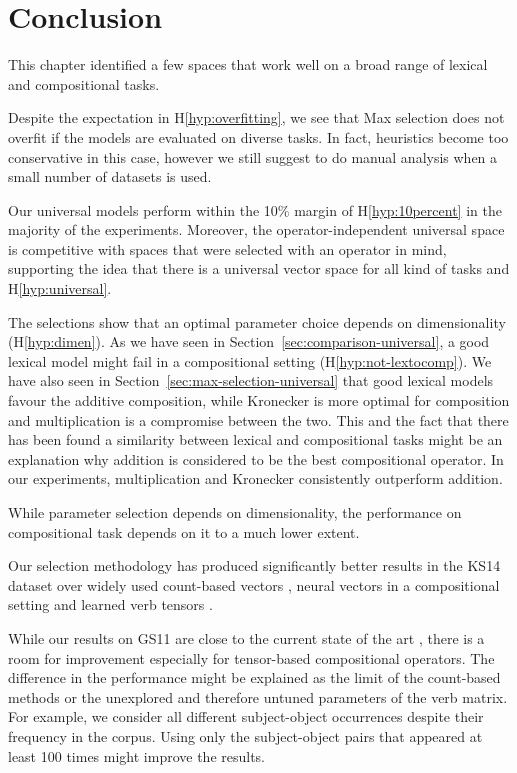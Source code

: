 \section{Conclusion}
\label{sec:conclusion-universal}

This chapter identified a few spaces that work well on a broad range of lexical and compositional tasks.

Despite the expectation in H\ref{hyp:overfitting}, we see that Max selection does not overfit if the models are evaluated on diverse tasks. In fact, heuristics become too conservative in this case, however we still suggest to do manual analysis when a small number of datasets is used.

Our universal models perform within the 10\% margin of H\ref{hyp:10percent} in the majority of the experiments. Moreover, the operator-independent universal space is competitive with spaces that were selected with an operator in mind, supporting the idea that there is a universal vector space for all kind of tasks and H\ref{hyp:universal}.

The selections show that an optimal parameter choice depends on dimensionality (H\ref{hyp:dimen}). As we have seen in Section~\ref{sec:comparison-universal}, a good lexical model might fail in a compositional setting (H\ref{hyp:not-lextocomp}). We have also seen in Section~\ref{sec:max-selection-universal} that good lexical models favour the additive composition, while Kronecker is more optimal for composition and multiplication is a compromise between the two. This and the fact that there has been found a similarity between lexical and compositional tasks \cite[\textcolor{citecolor}{Section~4}]{kiela-clark:2014:CVSC} might be an explanation why addition is considered to be the best compositional operator. In our experiments, multiplication and Kronecker consistently outperform addition.

While parameter selection depends on dimensionality, the performance on compositional task depends on it to a much lower extent.

Our selection methodology has produced significantly better results in the KS14 dataset over widely used count-based vectors \cite{milajevs-EtAl:2014:EMNLP2014}, neural vectors in a compositional setting \cite{milajevs-EtAl:2014:EMNLP2014,kim2015neural} and learned verb tensors \cite{fried-polajnar-clark:2015:ACL-IJCNLP,hashimoto-tsuruoka:2016:P16-1,hashimoto-tsuruoka:2015:CVSC}.

While our results on GS11 are close to the current state of the art \cite{hashimoto-tsuruoka:2016:P16-1}, there is a room for improvement especially for tensor-based compositional operators. The difference in the performance might be explained as the limit of the count-based methods or the unexplored and therefore untuned parameters of the verb matrix. For example, we consider all different subject-object occurrences despite their frequency in the corpus. Using only the subject-object pairs that appeared at least 100 times might improve the results.


